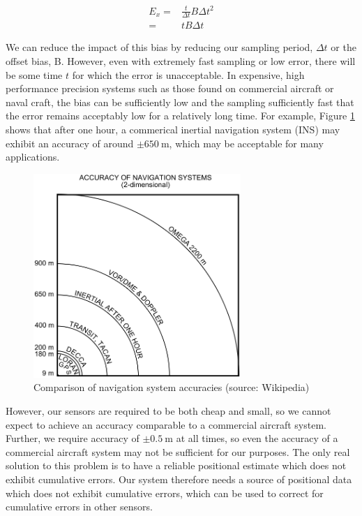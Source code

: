 \documentclass[capstone_report.tex]{subfiles}
\begin{document}
    \begin{align*} 
    	E_x=&\frac{t}{\Delta t}B\Delta t^2\\
    	=&tB\Delta t
    \end{align*}

    We can reduce the impact of this bias by reducing our sampling period, $\Delta t$ or the offset bias, B. However, even with extremely fast sampling or low error, there will be some time $t$ for which the error is unacceptable. In expensive, high performance precision systems such as those found on commercial aircraft or naval craft, the bias can be sufficiently low and the sampling sufficiently fast that the error remains acceptably low for a relatively long time. For example, Figure \ref{fig:inAcc} shows that after one hour, a commerical inertial navigation system (INS) may exhibit an accuracy of around $\pm \SI{650}{\meter}$, which may be acceptable for many applications.\\

    \begin{figure}[H]
        \centering
        \includegraphics[width=0.7\textwidth]{imgs/inertialAcc.png}
        \caption{Comparison of navigation system accuracies (source: Wikipedia)\label{fig:inAcc}}
    \end{figure}

    However, our sensors are required to be both cheap and small, so we cannot expect to achieve an accuracy comparable to a commercial aircraft system. Further, we require accuracy of $\pm \SI{0.5}{\meter}$ at all times, so even the accuracy of a commercial aircraft system may not be sufficient for our purposes. The only real solution to this problem is to have a reliable positional estimate which does not exhibit cumulative errors. Our system therefore needs a source of positional data which does not exhibit cumulative errors, which can be used to correct for cumulative errors in other sensors. \\
\end{document}
